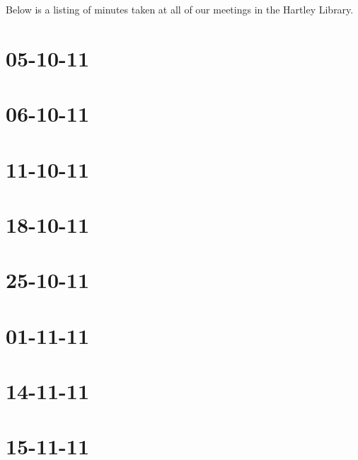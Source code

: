 Below is a listing of minutes taken at all of our meetings in the Hartley Library.

\section{05-10-11}

\section{06-10-11}

\section{11-10-11}

\section{18-10-11}

\section{25-10-11}

\section{01-11-11}

\section{14-11-11}

\section{15-11-11}


